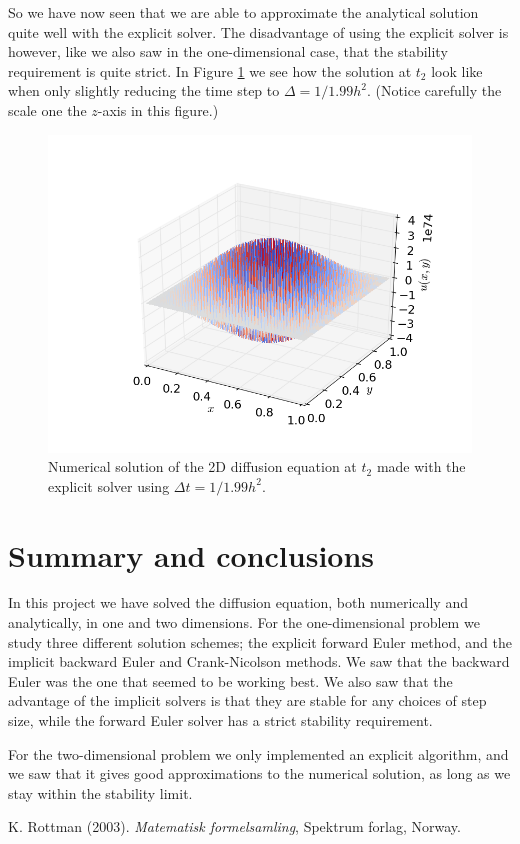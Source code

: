 \documentclass[12pt, a4paper]{article}
\begin{document}
So we have now seen that we are able to approximate the analytical solution quite well with the 
explicit solver. The disadvantage of using the explicit solver is however, like we also saw in the 
one-dimensional case, that the stability requirement is quite strict. In Figure \ref{fig:2d_us} we 
see how the solution at $t_2$ look like when only slightly reducing the time step to 
$\Delta = 1/1.99 h^2$. (Notice carefully the scale one the $z$-axis in this figure.) 

\begin{figure}
\begin{center}
\includegraphics[scale=0.5]{../Programs/Output/Diffusion_2d_t2_us.png}
\caption{Numerical solution of the 2D diffusion equation at $t_2$ made with the explicit solver using 
$\Delta t = 1/1.99 h^2$.}
\label{fig:2d_us}
\end{center}
\end{figure}

\section{Summary and conclusions}

In this project we have solved the diffusion equation, both numerically and analytically, in one and 
two dimensions. For the one-dimensional problem we study three different solution schemes; the 
explicit forward Euler method, and the implicit backward Euler and Crank-Nicolson methods. We saw that 
the backward Euler was the one that seemed to be working best. We also saw that the advantage of the 
implicit solvers is that they are stable for any choices of step size, while the forward Euler solver 
has a strict stability requirement. 

For the two-dimensional problem we only implemented an explicit algorithm, and we saw that it gives 
good approximations to the numerical solution, as long as we stay within the stability limit.  

\begin{thebibliography}{40}

 K. Rottman (2003). \textit{Matematisk formelsamling}, Spektrum forlag, Norway. 

\end{thebibliography}
\end{document}
